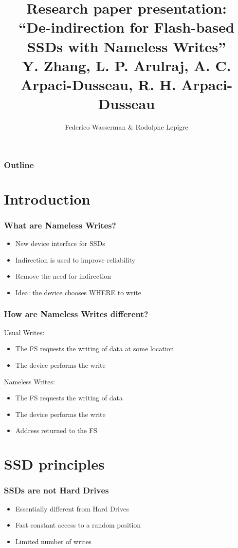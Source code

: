 \documentclass{beamer}
\title[\insertframenumber/\inserttotalframenumber]
      {Research paper presentation:\\
       ``De-indirection for Flash-based SSDs with Nameless Writes''\\
       \small{Y. Zhang, L. P. Arulraj, A. C. Arpaci-Dusseau, R. H. Arpaci-Dusseau}}
\author{Federico Wasserman \& Rodolphe Lepigre}
\institute{MOSIG - Parallel, Distributed and Embedded Systems}
\begin{document}
\begin{frame}
\titlepage
\end{frame}

\begin{frame}
  \frametitle{Outline}
  \tableofcontents[hideallsubsections]
\end{frame}

\section{Introduction}
\begin{frame}
  \frametitle{What are Nameless Writes?}
  \begin{itemize}
    \item New device interface for SSDs
    \item Indirection is used to improve reliability
    \item Remove the need for indirection
    \item Idea: the device chooses WHERE to write
  \end{itemize}
\end{frame}

\begin{frame}
  \frametitle{How are Nameless Writes different?}
  Usual Writes:
  \begin{itemize}
    \item The FS requests the writing of data at some location
    \item The device performs the write
  \end{itemize}

  Nameless Writes:
  \begin{itemize}
    \item The FS requests the writing of data
    \item The device performs the write
    \item Address returned to the FS
  \end{itemize}
\end{frame}

\section{SSD principles}
\begin{frame}
  \frametitle{SSDs are not Hard Drives}
  \begin{itemize}
    \item Essentially different from Hard Drives
    \item Fast constant access to a random position
    \item Limited number of writes
  \end{itemize}
\end{frame}
\end{document}
